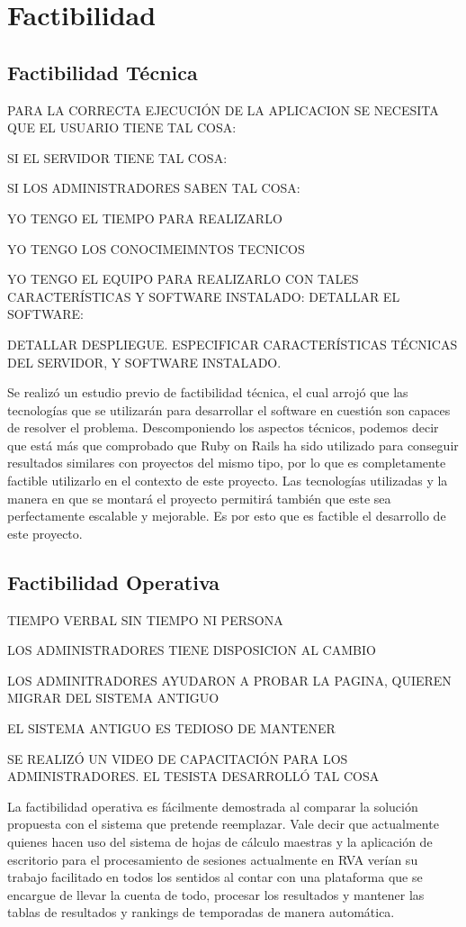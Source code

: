 \chapter{Factibilidad}

\section{Factibilidad Técnica}
PARA LA CORRECTA EJECUCIÓN DE LA APLICACION SE NECESITA QUE EL USUARIO TIENE TAL COSA:

SI EL SERVIDOR TIENE TAL COSA:

SI LOS ADMINISTRADORES SABEN TAL COSA:

YO TENGO EL TIEMPO PARA REALIZARLO

YO TENGO LOS CONOCIMEIMNTOS TECNICOS

YO TENGO EL EQUIPO PARA REALIZARLO CON TALES CARACTERÍSTICAS Y SOFTWARE INSTALADO: DETALLAR EL SOFTWARE:

DETALLAR DESPLIEGUE. ESPECIFICAR CARACTERÍSTICAS TÉCNICAS DEL SERVIDOR, Y SOFTWARE INSTALADO.


Se realizó un estudio previo de factibilidad técnica, el cual arrojó que las tecnologías que se utilizarán para desarrollar el software en cuestión son capaces de resolver el problema.
Descomponiendo los aspectos técnicos, podemos decir que está más que comprobado que Ruby on Rails ha sido utilizado para conseguir resultados similares con proyectos del mismo tipo, por lo que es completamente factible utilizarlo en el contexto de este proyecto.
Las tecnologías utilizadas y la manera en que se montará el proyecto permitirá también que este sea perfectamente escalable y mejorable.
Es por esto que es factible el desarrollo de este proyecto.

\section{Factibilidad Operativa}
TIEMPO VERBAL SIN TIEMPO NI PERSONA

LOS ADMINISTRADORES TIENE DISPOSICION AL CAMBIO

LOS ADMINITRADORES AYUDARON A PROBAR LA PAGINA, QUIEREN MIGRAR DEL SISTEMA ANTIGUO

EL SISTEMA ANTIGUO ES TEDIOSO DE MANTENER

SE REALIZÓ UN VIDEO DE CAPACITACIÓN PARA LOS ADMINISTRADORES. EL TESISTA DESARROLLÓ TAL COSA

La factibilidad operativa es fácilmente demostrada al comparar la solución propuesta con el sistema que pretende reemplazar. Vale decir que actualmente quienes hacen uso del sistema de hojas de cálculo maestras y la aplicación de escritorio para el procesamiento de sesiones actualmente en RVA verían su trabajo facilitado en todos los sentidos al contar con una plataforma que se encargue de llevar la cuenta de todo, procesar los resultados y mantener las tablas de resultados y rankings de temporadas de manera automática.

